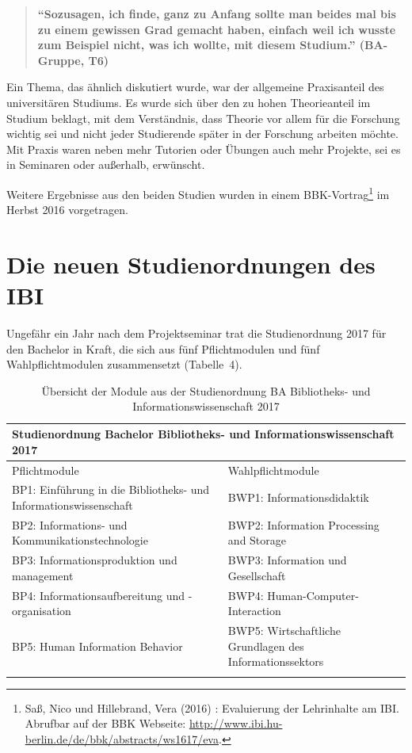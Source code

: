 \documentclass[a4paper,
fontsize=11pt,
oneside,
numbers=noperiodatend,
parskip=half-,
bibliography=totoc,
final
]{scrartcl}
\begin{document}
\begin{quote}
\textbf{\enquote{Sozusagen, ich finde, ganz zu Anfang sollte man beides
mal bis zu einem gewissen Grad gemacht haben, einfach weil ich wusste
zum Beispiel nicht, was ich wollte, mit diesem Studium.} (BA-Gruppe,
T6)}
\end{quote}

Ein Thema, das ähnlich diskutiert wurde, war der allgemeine Praxisanteil
des universitären Studiums. Es wurde sich über den zu hohen
Theorieanteil im Studium beklagt, mit dem Verständnis, dass Theorie vor
allem für die Forschung wichtig sei und nicht jeder Studierende später
in der Forschung arbeiten möchte. Mit Praxis waren neben mehr Tutorien
oder Übungen auch mehr Projekte, sei es in Seminaren oder außerhalb,
erwünscht.

Weitere Ergebnisse aus den beiden Studien wurden in einem
BBK-Vortrag\footnote{Saß, Nico und Hillebrand, Vera (2016) : Evaluierung
  der Lehrinhalte am IBI. Abrufbar auf der BBK Webseite: \href{http://www.ibi.hu-berlin.de/de/bbk/abstracts/ws1617/eva}{http://www.ibi.hu-berlin.de/de/bbk/abstracts/ws1617/eva}.}
im Herbst 2016 vorgetragen.


\section{Die neuen Studienordnungen des IBI}

Ungefähr ein Jahr nach dem Projektseminar trat die Studienordnung 2017
für den Bachelor in Kraft, die sich aus fünf Pflichtmodulen und fünf
Wahlpflichtmodulen zusammensetzt (Tabelle~4).

\begin{longtable}[]{@{}p{8cm}p{8cm}@{}}
\toprule
\multicolumn{2}{l}{\textbf{Studienordnung Bachelor Bibliotheks- und Informationswissenschaft 2017}} \tabularnewline
\midrule
\endhead
Pflichtmodule & Wahlpflichtmodule\tabularnewline
\midrule
BP1: Einführung in die Bibliotheks- und Informationswissenschaft & BWP1:
Informationsdidaktik\tabularnewline
BP2: Informations- und Kommunikationstechnologie & BWP2: Information
Processing and Storage\tabularnewline
BP3: Informationsproduktion und \-manage\-ment & BWP3: Information und
Gesellschaft\tabularnewline
BP4: Informationsaufbereitung und -organi\-sation & BWP4:
Human-Computer-Interaction\tabularnewline
BP5: Human Information Behavior & BWP5: Wirtschaftliche Grundlagen des
Informationssektors\tabularnewline
\bottomrule
\caption{Übersicht der Module aus der Studienordnung BA Bibliotheks-
und Informationswissenschaft 2017}
\end{longtable}
\end{document}
